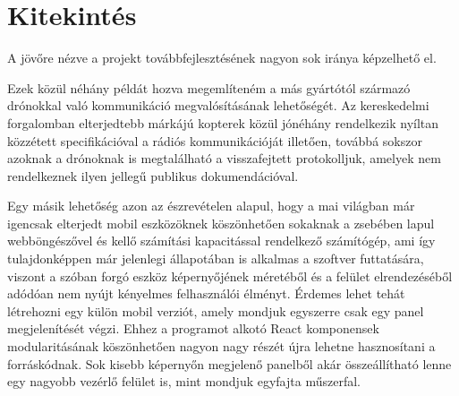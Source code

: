 \section{Kitekintés}

A jövőre nézve a projekt továbbfejlesztésének nagyon sok iránya képzelhető el.

Ezek közül néhány példát hozva megemlíteném a más gyártótól származó drónokkal
való kommunikáció megvalósításának lehetőségét. Az kereskedelmi forgalomban
elterjedtebb márkájú kopterek közül jónéhány rendelkezik nyíltan közzétett
specifikációval a rádiós kommunikációját illetően, továbbá sokszor azoknak a
drónoknak is megtalálható a visszafejtett protokolljuk, amelyek nem rendelkeznek
ilyen jellegű publikus dokumendációval.

Egy másik lehetőség azon az észrevételen alapul, hogy a mai világban már
igencsak elterjedt mobil eszközöknek köszönhetően sokaknak a zsebében lapul
webböngészővel és kellő számítási kapacitással rendelkező számítógép, ami így
tulajdonképpen már jelenlegi állapotában is alkalmas a szoftver futtatására,
viszont a szóban forgó eszköz képernyőjének méretéből és a felület
elrendezéséből adódóan nem nyújt kényelmes felhasználói élményt. Érdemes lehet
tehát létrehozni egy külön mobil verziót, amely mondjuk egyszerre csak egy panel
megjelenítését végzi. Ehhez a programot alkotó React komponensek modularitásának
köszönhetően nagyon nagy részét újra lehetne hasznosítani a forráskódnak. Sok
kisebb képernyőn megjelenő panelből akár összeállítható lenne egy nagyobb
vezérlő felület is, mint mondjuk egyfajta műszerfal.
